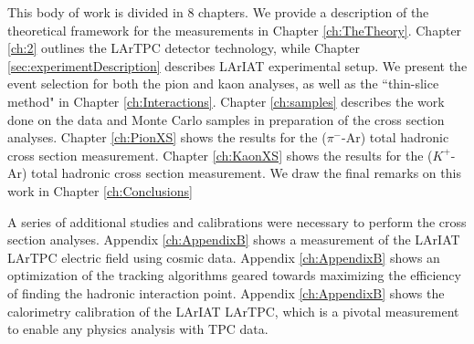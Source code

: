 This body of work is divided in 8 chapters.
We provide a description of the theoretical framework for the measurements in  Chapter \ref{ch:TheTheory}. Chapter \ref{ch:2} outlines the LArTPC detector technology, while
Chapter \ref{sec:experimentDescription} describes LArIAT experimental setup. We present the event selection for both the pion and kaon analyses, as well as the ``thin-slice method" in Chapter \ref{ch:Interactions}.  Chapter \ref{ch:samples}  describes the work done on the data and Monte Carlo samples in preparation of the cross section analyses.
Chapter \ref{ch:PionXS} shows  the results for the ($\pi^-$-Ar) total hadronic cross section measurement. Chapter \ref{ch:KaonXS} shows  the results for the ($K^+$-Ar) total hadronic cross section measurement. We draw the final remarks on this work in Chapter \ref{ch:Conclusions}

A series of additional studies and calibrations were necessary to perform the cross section analyses. Appendix \ref{ch:AppendixB} shows a measurement of the LArIAT LArTPC electric field using cosmic data. Appendix \ref{ch:AppendixB} shows an optimization of the tracking algorithms geared towards maximizing the efficiency of finding the hadronic interaction point. Appendix \ref{ch:AppendixB} shows the calorimetry calibration of the LArIAT LArTPC, which is a pivotal measurement to enable any physics analysis with TPC data.  


